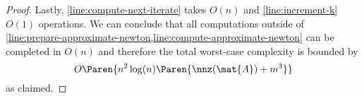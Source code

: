 \begin{proof}
  Lastly, \cref{line:compute-next-iterate} takes \(O(n)\) and \cref{line:increment-k} \(O(1)\) operations.
  We can conclude that all computations outside of \cref{line:prepare-approximate-newton,line:compute-approximate-newton} can be completed in \(O(n)\) and therefore the total worst-case complexity is bounded by
  \[ O \Paren{n^2 \log(n) \Paren{\nnz(\mat{A}) + m^3}} \]
  as claimed.
\end{proof}
